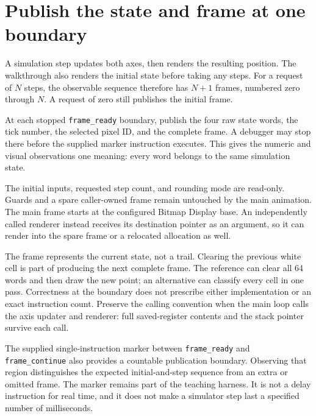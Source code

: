 \section{Publish the state and frame at one boundary}
A simulation step updates both axes, then renders the resulting position. The
walkthrough also renders the initial state before taking any steps. For a request
of \(N\) steps, the observable sequence therefore has \(N+1\) frames, numbered
zero through \(N\). A request of zero still publishes the initial frame.

At each stopped \texttt{frame\_ready} boundary, publish the four raw state words,
the tick number, the selected pixel ID, and the complete frame. A debugger may
stop there before the supplied marker instruction executes. This gives the
numeric and visual observations one meaning: every word belongs to the same
simulation state.

The initial inputs, requested step count, and rounding mode are read-only. Guards
and a spare caller-owned frame remain untouched by the main animation. The main
frame starts at the configured Bitmap Display base. An independently called
renderer instead receives its destination pointer as an argument, so it can
render into the spare frame or a relocated allocation as well.

The frame represents the current state, not a trail. Clearing the previous white
cell is part of producing the next complete frame. The reference can clear all
64 words and then draw the new point; an alternative can classify every cell in
one pass. Correctness at the boundary does not prescribe either implementation
or an exact instruction count. Preserve the calling convention when the main
loop calls the axis updater and renderer: full saved-register contents and the
stack pointer survive each call.

The supplied single-instruction marker between \texttt{frame\_ready} and
\texttt{frame\_continue} also provides a countable publication boundary. Observing
that region distinguishes the expected initial-and-step sequence from an extra
or omitted frame. The marker remains part of the teaching harness. It is not a
delay instruction for real time, and it does not make a simulator step last a
specified number of milliseconds.
